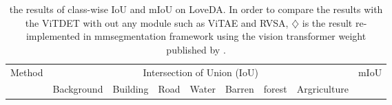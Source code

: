 \begin{table*}[t]{\textwidth=0mm}
{\begin{tabular}{l|c c c c c | c | c}
    \end{tabular}
    }
    \label{tab:potsdam table}
\end{table*} \begin{table*}[t]{\textwidth=0mm}
    \centering
    \caption{the results of class-wise IoU and mIoU on LoveDA. In order to compare the results with the ViTDET with out any module such as ViTAE and RVSA, $\diamondsuit$ is the result re-implemented in mmsegmentation framework using the vision transformer weight published by \cite{wang2022advancing}.}
    \renewcommand{\arraystretch}{1.0}
    {
    \begin{tabular}{l|c c c c c c c | c}
    
        \hline
       
       
       \multirow{2}{*}{Method} & \multicolumn{7}{c|}{Intersection of Union (IoU)} & \multirow{2}{*}{mIoU} \\ \cline{2-8}
        & Background & Building & Road & Water & Barren & forest & Argriculture &  \\ \hline


\end{tabular}}
\end{table*}
